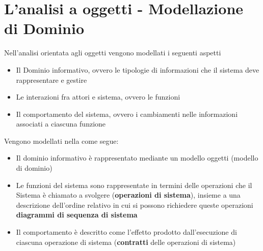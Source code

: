 \section{L'analisi a oggetti - Modellazione di Dominio}
Nell'analisi orientata agli oggetti vengono modellati i seguenti
aspetti
\begin{itemize}
    \item Il Dominio informativo, ovvero le tipologie di informazioni che il sistema deve
    rappresentare e gestire
    \item Le interazioni fra attori e sistema, ovvero le funzioni
    \item Il comportamento del sistema, ovvero i cambiamenti nelle informazioni
    associati a ciascuna funzione
\end{itemize}
Vengono modellati nella come segue:
\begin{itemize}
    \item Il dominio informativo è rappresentato mediante un modello oggetti (modello di dominio)
    \item Le funzioni del sistema sono rappresentate in termini delle operazioni che il Sistema
    è chiamato a svolgere (\textbf{operazioni di sistema}), insieme a una descrizione dell'ordine
    relativo in cui si possono richiedere queste operazioni \textbf{diagrammi di sequenza di sistema}
    \item Il comportamento è descritto come l'effetto prodotto dall'esecuzione di
    ciascuna operazione di sistema (\textbf{contratti} delle operazioni di sistema)
\end{itemize}
